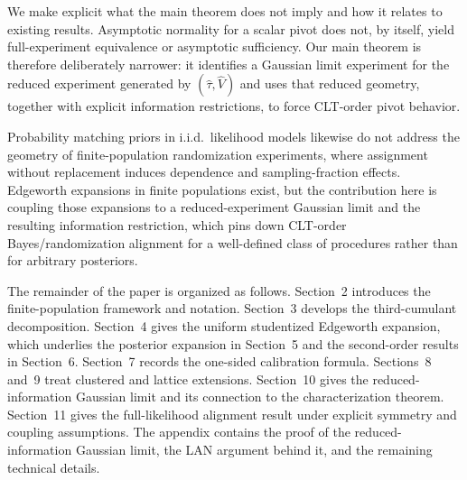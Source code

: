 \documentclass[aos]{imsart}
\theoremstyle{definition}
\theoremstyle{plain}
\begin{document}
We make explicit what the main theorem does not imply and how it relates to existing results. Asymptotic normality for a scalar pivot does not, by itself, yield full-experiment equivalence or asymptotic sufficiency. Our main theorem is therefore deliberately narrower: it identifies a Gaussian limit experiment for the reduced experiment generated by $(\hat\tau,\hat V)$ and uses that reduced geometry, together with explicit information restrictions, to force CLT-order pivot behavior.

Probability matching priors in i.i.d.\ likelihood models likewise do not address the geometry of finite-population randomization experiments, where assignment without replacement induces dependence and sampling-fraction effects. Edgeworth expansions in finite populations exist, but the contribution here is coupling those expansions to a reduced-experiment Gaussian limit and the resulting information restriction, which pins down CLT-order Bayes/randomization alignment for a well-defined class of procedures rather than for arbitrary posteriors.

The remainder of the paper is organized as follows. Section~2 introduces the finite-population framework and notation. Section~3 develops the third-cumulant decomposition. Section~4 gives the uniform studentized Edgeworth expansion, which underlies the posterior expansion in Section~5 and the second-order results in Section~6. Section~7 records the one-sided calibration formula. Sections~8 and~9 treat clustered and lattice extensions. Section~10 gives the reduced-information Gaussian limit and its connection to the characterization theorem. Section~11 gives the full-likelihood alignment result under explicit symmetry and coupling assumptions. The appendix contains the proof of the reduced-information Gaussian limit, the LAN argument behind it, and the remaining technical details.
\end{document}
